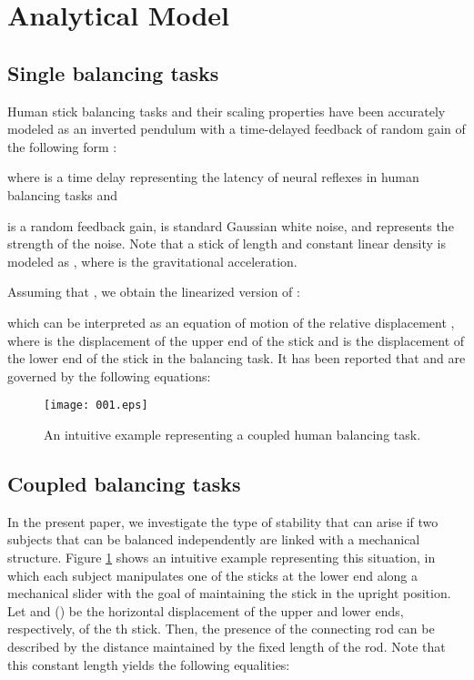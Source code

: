 \documentclass[12pt,a4paper]{ijicic}
\def\lfig#1{\label{fig:#1}}\def\rfig#1{Fig.\ref{fig:#1}}
\def\Rfig#1{Figure \ref{fig:#1}}
\begin{document}
\section{Analytical Model}


\subsection{Single balancing tasks}

Human stick balancing tasks and their scaling properties have been
accurately modeled as an inverted pendulum with a time-delayed feedback
of random gain of the following form \cite{Cabrera02}:

where  is a time delay representing the latency of neural
reflexes in human balancing tasks and 

is a random feedback gain,  is standard Gaussian white noise,
and  represents the strength of the noise.  Note that a stick of
length  and constant linear density is modeled as ,
where  is the gravitational acceleration.

 Assuming that , we obtain
the linearized version of :

which can be interpreted as an equation of motion of the relative
displacement , where  is the displacement of
the upper end of the stick and  is the displacement of the lower
end of the stick in the balancing task. It has been reported
\cite{Bormann04} that  and  are governed by the
following equations:


\begin{figure}[t]
 \centering
 \texttt{[image: 001.eps]}
 \caption{An intuitive example representing a coupled human balancing
 task.}  \lfig{cip_photo}
\end{figure}

\subsection{Coupled balancing tasks}

In the present paper, we investigate the type of stability that can
arise if two subjects that can be balanced independently are linked with
a mechanical structure. \Rfig{cip_photo} shows an intuitive example
representing this situation, in which each subject manipulates one of
the sticks at the lower end along a mechanical slider with the goal of
maintaining the stick in the upright position. Let  and 
() be the horizontal displacement of the upper and lower ends,
respectively, of the th stick.  Then, the presence of the connecting
rod can be described by the distance  maintained by
the fixed length of the rod.  Note that this constant length yields the
following equalities:
\end{document}
